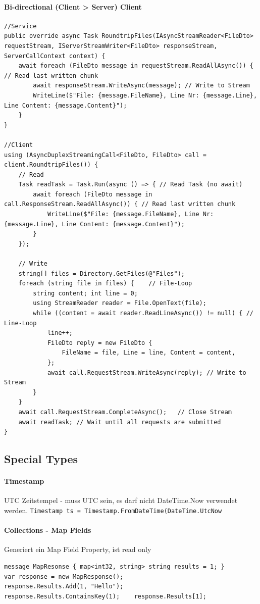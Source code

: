 \documentclass[
a4paper,
oneside,
10pt,
fleqn,
headsepline,
toc=listofnumbered, 
bibliography=totocnumbered]{scrartcl}
\begin{document}
\paragraph{Bi-directional (Client > Server) Client}
\begin{lstlisting}
//Service
public override async Task RoundtripFiles(IAsyncStreamReader<FileDto> requestStream, IServerStreamWriter<FileDto> responseStream, ServerCallContext context) {
    await foreach (FileDto message in requestStream.ReadAllAsync()) { // Read last written chunk
        await responseStream.WriteAsync(message); // Write to Stream
        WriteLine($"File: {message.FileName}, Line Nr: {message.Line}, Line Content: {message.Content}");
    }
}

//Client
using (AsyncDuplexStreamingCall<FileDto, FileDto> call = client.RoundtripFiles()) {
    // Read
    Task readTask = Task.Run(async () => { // Read Task (no await)
        await foreach (FileDto message in call.ResponseStream.ReadAllAsync()) { // Read last written chunk
            WriteLine($"File: {message.FileName}, Line Nr: {message.Line}, Line Content: {message.Content}");
        }
    });
    
    // Write
    string[] files = Directory.GetFiles(@"Files");
    foreach (string file in files) {    // File-Loop
        string content; int line = 0;
        using StreamReader reader = File.OpenText(file);
        while ((content = await reader.ReadLineAsync()) != null) { // Line-Loop
            line++;
            FileDto reply = new FileDto {
                FileName = file, Line = line, Content = content,
            };
            await call.RequestStream.WriteAsync(reply); // Write to Stream
        }
    }
    await call.RequestStream.CompleteAsync();   // Close Stream
    await readTask; // Wait until all requests are submitted
}
\end{lstlisting}

\subsection{Special Types}
\paragraph{Timestamp} UTC Zeitstempel - muss UTC sein, es darf nicht DateTime.Now verwendet werden. \lstinline{Timestamp ts = Timestamp.FromDateTime(DateTime.UtcNow}
\paragraph{Collections - Map Fields} Generiert ein Map Field Property, ist read only
\begin{lstlisting}
message MapResonse { map<int32, string> string results = 1; }
var response = new MapResponse();
response.Results.Add(1, "Hello");
response.Results.ContainsKey(1);    response.Results[1];
\end{lstlisting}
\end{document}
